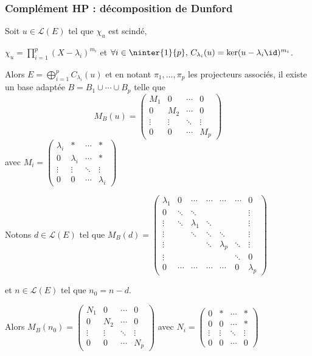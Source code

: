 \subsubsection{Complément HP : décomposition de Dunford }


Soit $u \in \mathscr L(E)$ tel que $\chi_u$ est scindé, 

$\chi_u = \displaystyle \prod_{i = 1 }^{ p } (X - \lambda_i)^{m_i}$ et 
$\forall i \in \ninter{1}{p}, \, C_{\lambda_i}(u) = \ker (u - \lambda_i \id)^{m_i}$.

Alors $E = \displaystyle \bigoplus_{i = 1 }^{ p } C_{\lambda_i}(u)$ et
en notant $\pi_1, \ldots, \pi_p$ les projecteurs associés, il existe un base adaptée $B = B_1 \cup \cdots \cup B_p$
telle que 
$$M_B(u) = \begin{pmatrix}
    M_1 & 0 & \cdots & 0 \\
    0 & M_2 & \cdots & 0 \\
    \vdots & \vdots & \ddots & \vdots \\
    0 & 0 & \cdots & M_p
\end{pmatrix}$$ avec $M_i = \begin{pmatrix}
    \lambda_i & * & \cdots & * \\
    0 & \lambda_i & \cdots & * \\
    \vdots & \vdots & \ddots & \vdots \\
    0 & 0 & \cdots & \lambda_i
\end{pmatrix}$

Notons $d \in \mathscr L(E)$ tel que $M_B(d) = \begin{pmatrix}
    \lambda_1 & 0 & \cdots & \cdots & \cdots & \cdots & 0 \\
    0 & \ddots & \ddots & & & & \vdots \\
    \vdots & \ddots & \lambda_1 & \ddots & & & \vdots \\
    \vdots & & \ddots & \ddots & \ddots &  & \vdots \\
    \vdots &  & & \ddots & \lambda_p &\ddots  & \vdots \\
    \vdots & &  & & & \ddots & 0 \\
    0 & \cdots & \cdots & \cdots & \cdots & 0 & \lambda_p        
\end{pmatrix}$ 

et $n \in \mathscr L(E)$ tel que $n_0 = n - d$. 

Alors $M_B(n_0) = \begin{pmatrix}
    N_1 & 0 & \cdots & 0 \\
    0 & N_2 & \cdots & 0 \\
    \vdots & \vdots & \ddots & \vdots \\
    0 & 0 & \cdots & N_p
\end{pmatrix}$ avec $N_i = \begin{pmatrix}
    0 & * & \cdots & * \\
    0 & 0 & \cdots & * \\
    \vdots & \vdots & \ddots & \vdots \\
    0 & 0 & \cdots & 0
\end{pmatrix}$

